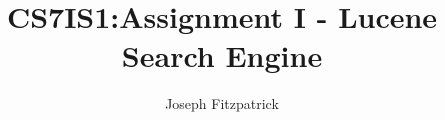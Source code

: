 \documentclass[acmtog, authorversion]{acmart}
\begin{document}
\title{CS7IS1:Assignment I - Lucene Search Engine}

\author{Joseph Fitzpatrick}



\maketitle


\end{document}
